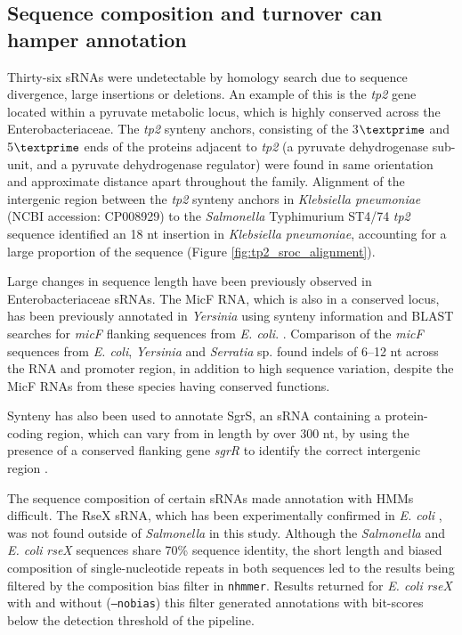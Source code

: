 \newpage

\subsection{Sequence composition and turnover can hamper annotation}

Thirty-six sRNAs were undetectable by homology search due to sequence divergence, large insertions or deletions. An example of this is the \textit{tp2} gene located within a pyruvate metabolic locus, which is highly conserved across the Enterobacteriaceae. The \textit{tp2} synteny anchors, consisting of the 3$\textprime$ and 5$\textprime$ ends of the proteins adjacent to \textit{tp2} (a pyruvate dehydrogenase sub-unit, and a pyruvate dehydrogenase regulator) were found in same orientation and approximate distance apart throughout the family. Alignment of the intergenic region between the \textit{tp2} synteny anchors in \textit{Klebsiella pneumoniae} (NCBI accession: CP008929) to the \textit{Salmonella} Typhimurium ST4/74 \textit{tp2} sequence identified an 18 nt insertion in \textit{Klebsiella pneumoniae}, accounting for a large proportion of the sequence (Figure \ref{fig:tp2_sroc_alignment}).

Large changes in sequence length have been previously observed in Enterobacteriaceae sRNAs. The MicF RNA, which is also in a conserved locus, has been previously annotated in \textit{Yersinia} using synteny information and BLAST searches for \textit{micF} flanking sequences from \textit{E. coli}. \citep{Delihas2003-bp}. Comparison of the \textit{micF} sequences from \textit{E. coli}, \textit{Yersinia} and \textit{Serratia} sp. found indels of 6--12 nt across the RNA and promoter region, in addition to high sequence variation, despite the MicF RNAs from these species having conserved functions. 

Synteny has also been used to annotate SgrS, an sRNA containing a protein-coding region, which can vary from in length by over 300 nt, by using the presence of a conserved flanking gene \textit{sgrR} to identify the correct intergenic region \citep{Horler2009-va}.  

The sequence composition of certain sRNAs made annotation with HMMs difficult. The RseX sRNA, which has been experimentally confirmed in \textit{E. coli} \citep{Douchin2006-dv}, was not found outside of \textit{Salmonella} in this study. Although the \textit{Salmonella} and \textit{E. coli} \textit{rseX} sequences share 70\% sequence identity, the short length and biased composition of single-nucleotide repeats in both sequences led to the results being filtered by the composition bias filter in \texttt{nhmmer}. Results returned for \textit{E. coli} \textit{rseX} with and without (\texttt{--nobias}) this filter generated annotations with bit-scores below the detection threshold of the pipeline.

